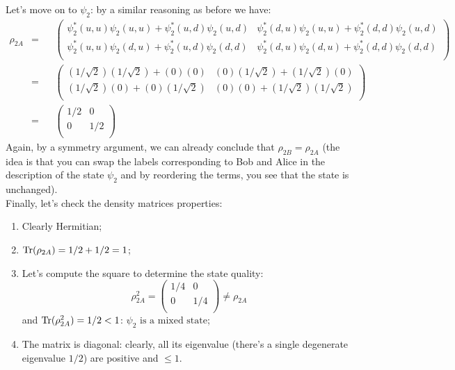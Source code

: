 \documentclass[solutions.tex]{subfiles}
\begin{document}
\hr
Let's move on to $\psi_2$: by a similar reasoning as before we have:
\begin{equation*}\begin{aligned}
	\rho_{2A} &=&& \begin{pmatrix}
		\psi_2^*(u,u)\psi_2(u,u) + \psi_2^*(u,d)\psi_2(u,d) &
			\psi_2^*(d,u)\psi_2(u,u) + \psi_2^*(d,d)\psi_2(u,d) \\
		\psi_2^*(u,u)\psi_2(d,u) + \psi_2^*(u,d)\psi_2(d,d)&
			\psi_2^*(d,u)\psi_2(d,u) + \psi_2^*(d,d)\psi_2(d,d) \\
	\end{pmatrix} \\
	~ &=&& \begin{pmatrix}
		(1/\sqrt2)(1/\sqrt2) + (0)(0) & (0)(1/\sqrt2) + (1/\sqrt2)(0) \\
		(1/\sqrt2)(0) + (0)(1/\sqrt2) & (0)(0) + (1/\sqrt2)(1/\sqrt2) \\
	\end{pmatrix} \\
	~ &=&& \boxed{\begin{pmatrix}
		1/2 & 0 \\
		0 & 1/2 \\
	\end{pmatrix}}
\end{aligned}\end{equation*}
Again, by a symmetry argument, we can already conclude that
$\rho_{2B} = \rho_{2A}$ (the idea is that you can swap the labels
corresponding to Bob and Alice in the description of the state $\psi_2$
and by reordering the terms, you see that the state is unchanged). \\

Finally, let's check the density matrices properties:
\begin{enumerate}
	\item Clearly Hermitian;
	\item $\text{Tr}(\rho_{2A}) = 1/2+1/2 = 1$;
	\item Let's compute the square to determine the state quality:
	\[ \rho_{2A}^2 = \begin{pmatrix}
		1/4 & 0 \\
		0 & 1/4 \\
	\end{pmatrix} \neq \rho_{2A}
	\] and $\text{Tr}(\rho_{2A}^2) = 1/2 < 1$: $\boxed{\text{$\psi_2$ is
	a mixed state}}$;
	\item The matrix is diagonal: clearly, all its eigenvalue (there's
	a single degenerate eigenvalue $1/2$) are positive and $\leq 1$.
\end{enumerate}
\end{document}
